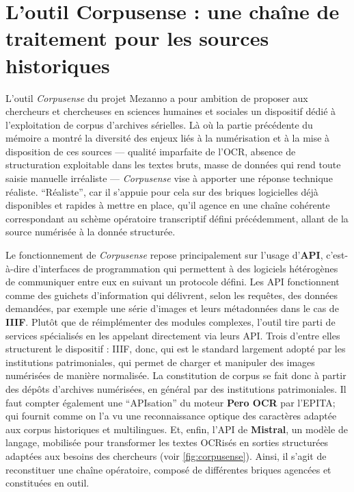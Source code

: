\chapter{L'outil Corpusense : une chaîne de traitement pour les sources historiques}

L’outil \emph{Corpusense} du projet Mezanno a pour ambition de proposer aux chercheurs et chercheuses en sciences humaines et sociales un dispositif dédié à l’exploitation de corpus d’archives sérielles. Là où la partie précédente du mémoire a montré la diversité des enjeux liés à la numérisation et à la mise à disposition de ces sources — qualité imparfaite de l’OCR, absence de structuration exploitable dans les textes bruts, masse de données qui rend toute saisie manuelle irréaliste — \emph{Corpusense} vise à apporter une réponse technique réaliste. \enquote{Réaliste}, car il s’appuie pour cela sur des briques logicielles déjà disponibles et rapides à mettre en place, qu’il agence en une chaîne cohérente correspondant au schème opératoire transcriptif défini précédemment, allant de la source numérisée à la donnée structurée.

Le fonctionnement de \emph{Corpusense} repose principalement sur l’usage d’\textbf{API}, c’est-à-dire d’interfaces de programmation qui permettent à des logiciels hétérogènes de communiquer entre eux en suivant un protocole défini. Les API fonctionnent comme des guichets d'information qui délivrent, selon les requêtes, des données demandées, par exemple une série d'images et leurs métadonnées dans le cas de \textbf{IIIF}. Plutôt que de réimplémenter des modules complexes, l’outil tire parti de services spécialisés en les appelant directement via leurs API. Trois d’entre elles structurent le dispositif : IIIF, donc, qui est le standard largement adopté par les institutions patrimoniales, qui permet de charger et manipuler des images numérisées de manière normalisée. La constitution de corpus se fait donc à partir des dépôts d'archives numérisées, en général par des institutions patrimoniales. Il faut compter également une \enquote{APIsation} du moteur \textbf{Pero OCR} par l'EPITA; qui fournit comme on l'a vu une reconnaissance optique des caractères adaptée aux corpus historiques et multilingues. Et, enfin, l’API de \textbf{Mistral}, un modèle de langage, mobilisée pour transformer les textes OCRisés en sorties structurées adaptées aux besoins des chercheurs (voir \ref{fig:corpusense}). Ainsi, il s'agit de reconstituer une chaîne opératoire, composé de différentes briques agencées et constituées en outil.


